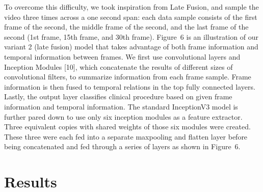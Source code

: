 \documentclass[letterpaper, 10 pt, conference]{ieeeconf}  %
\newcommand{\bbc}[1]{\textcolor{blue}{(Bobby: #1)}}
\newcommand{\lingfeng}[1]{\textcolor{orange}{(Lingfeng: #1)}}
\begin{document}
To overcome this difficulty, we took inspiration from Late Fusion, and sample the video three times across a one second span: each data sample consists of the first frame of the second, the middle frame of the second, and the last frame of the second (1st frame, 15th frame, and 30th frame). Figure~6 is an illustration of our variant 2 (late fusion) model that takes advantage of both frame information and temporal information between frames. We first use convolutional layers and Inception Modules [10], which concatenate the results of different sizes of convolutional filters, to summarize information from each frame sample. Frame information is then fused to temporal relations in the top fully connected layers. Lastly, the output layer classifies clinical procedure based on given frame information and temporal information. 
The standard InceptionV3 model is further pared down to use only six inception modules as a feature extractor. Three equivalent copies with shared weights of those six modules were created. These three were each fed into a separate maxpooling and flatten layer before being concatenated and fed through a series of layers as shown in Figure~6. 


\section{Results}
\end{document}
